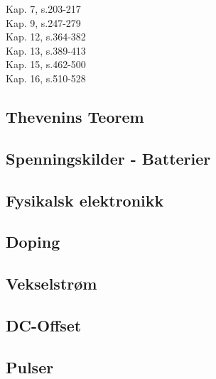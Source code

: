 Kap.  7, s.203-217 \\
Kap.  9, s.247-279 \\
Kap. 12, s.364-382 \\
Kap. 13, s.389-413 \\
Kap. 15, s.462-500 \\
Kap. 16, s.510-528

\subsection{Thevenins Teorem}


\subsection{Spenningskilder - Batterier}


\subsection{Fysikalsk elektronikk}


\subsection{Doping}


\subsection{Vekselstrøm}


\subsection{DC-Offset}


\subsection{Pulser}

